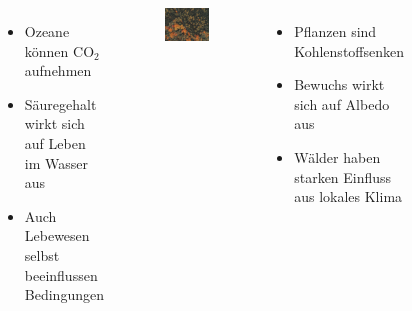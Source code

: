 \begin{frame}
\begin{columns}
\begin{figure}
		\end{figure}
			\begin{itemize}
				\item Ozeane können CO$_2$ aufnehmen
				\item Säuregehalt wirkt sich auf Leben im Wasser aus
				\item Auch Lebewesen selbst beeinflussen Bedingungen
			\end{itemize}
		\begin{figure}
			\centering
			\includegraphics[trim={0cm 0cm 0cm 3.8cm}, clip, width=\linewidth]{bilder/baeume}
		\end{figure}
			\begin{itemize}
				\item Pflanzen sind Kohlenstoffsenken
				\item Bewuchs wirkt sich auf Albedo aus
				\item Wälder haben starken Einfluss aus lokales Klima
			\end{itemize}
	\end{columns}


\end{frame}
